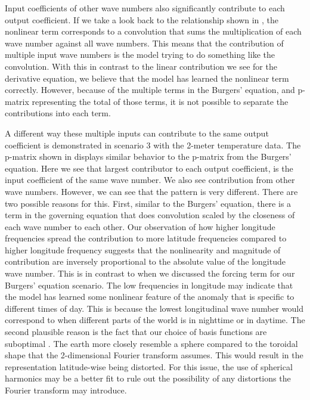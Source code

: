 Input coefficients of other wave numbers also significantly contribute to each output coefficient. If we take a look back to the relationship shown in , the nonlinear term corresponds to a convolution that sums the multiplication of each wave number against all wave numbers. This means that the contribution of multiple input wave numbers is the model trying to do something like the convolution. With this in contrast to the linear contribution we see for the derivative equation, we believe that the model has learned the nonlinear term correctly. However, because of the multiple terms in the Burgers' equation, and p-matrix representing the total of those terms, it is not possible to separate the contributions into each term.

A different way these multiple inputs can contribute to the same output coefficient is demonstrated in scenario 3 with the 2-meter temperature data. The p-matrix shown in  displays similar behavior to the p-matrix from the Burgers' equation. Here we see that largest contributor to each output coefficient, is the input coefficient of the same wave number. We also see contribution from other wave numbers. However, we can see that the pattern is very different. There are two possible reasons for this. First, similar to the Burgers' equation, there is a term in the governing equation that does convolution scaled by the closeness of each wave number to each other. Our observation of how higher longitude frequencies spread the contribution to more latitude frequencies compared to higher longitude frequency suggests that the nonlinearity and magnitude of contribution are inversely proportional to the absolute value of the longitude wave number. This is in contrast to when we discussed the forcing term for our Burgers' equation scenario. The low frequencies in longitude may indicate that the model has learned some nonlinear feature of the anomaly that is specific to different times of day. This is because the lowest longitudinal wave number would correspond to when different parts of the world is in nighttime or in daytime. The second plausible reason is the fact that our choice of basis functions are suboptimal \autocite{bonevSphericalFourierNeural2023,shenSpectralMethodsAlgorithms2011}. The earth more closely resemble a sphere compared to the toroidal shape that the 2-dimensional Fourier transform assumes. This would result in the representation latitude-wise being distorted. For this issue, the use of spherical harmonics may be a better fit to rule out the possibility of any distortions the Fourier transform may introduce.

